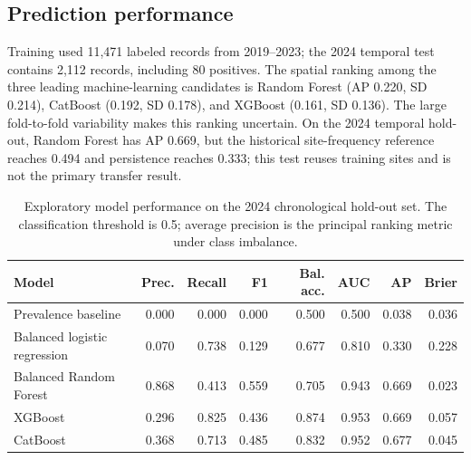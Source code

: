 \documentclass[pdflatex,sn-mathphys,Numbered]{sn-jnl}
\begin{document}
\subsection{Prediction performance}
Training used 11,471 labeled records from 2019--2023; the 2024 temporal test contains 2,112 records, including 80 positives. The spatial ranking among the three leading machine-learning candidates is Random Forest (AP 0.220, SD 0.214), CatBoost (0.192, SD 0.178), and XGBoost (0.161, SD 0.136). The large fold-to-fold variability makes this ranking uncertain. On the 2024 temporal hold-out, Random Forest has AP 0.669, but the historical site-frequency reference reaches 0.494 and persistence reaches 0.333; this test reuses training sites and is not the primary transfer result.

\begin{table}[t]
\centering
\caption{Exploratory model performance on the 2024 chronological hold-out set. The classification threshold is 0.5; average precision is the principal ranking metric under class imbalance.}
\label{tab:model-performance}
\small
\begin{tabular}{lrrrrrrr}
\toprule
Model & Prec. & Recall & F1 & Bal. acc. & AUC & AP & Brier \\
\midrule
Prevalence baseline & 0.000 & 0.000 & 0.000 & 0.500 & 0.500 & 0.038 & 0.036 \\
Balanced logistic regression & 0.070 & 0.738 & 0.129 & 0.677 & 0.810 & 0.330 & 0.228 \\
Balanced Random Forest & 0.868 & 0.413 & 0.559 & 0.705 & 0.943 & 0.669 & 0.023 \\
XGBoost & 0.296 & 0.825 & 0.436 & 0.874 & 0.953 & 0.669 & 0.057 \\
CatBoost & 0.368 & 0.713 & 0.485 & 0.832 & 0.952 & 0.677 & 0.045 \\
\bottomrule
\end{tabular}
\end{table}
\end{document}
